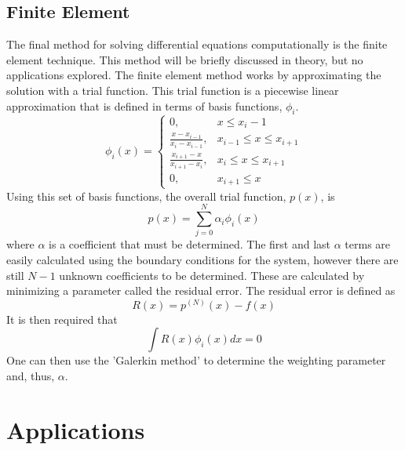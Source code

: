 \documentclass[12pt]{article}
\begin{document}
\subsection{Finite Element}
The final method for solving differential equations computationally is the finite element technique.  This method will be briefly discussed in theory, but no applications explored.  The finite element method works by approximating the solution with a trial function.  This trial function is a piecewise linear approximation that is defined in terms of basis functions, $\phi_i$.
 \begin{displaymath}
   \phi_i(x) = \left\{
     \begin{array}{lr}
       0 ,&  x\leq x_i-1\\
       \frac{x-x_{i-1}}{x_i-x_{i-1}}, &  x_{i-1}\leq x \leq x_{i+1}\\
       \frac{x_{i+1}-x}{x_{i+1}-x_i}, &  x_i\leq x \leq x_{i+1} \\
       0, & x_{i+1} \leq x
     \end{array}
   \right.
\end{displaymath}
Using this set of basis functions, the overall trial function, $p(x)$, is
\begin{equation}
\label{trialFunc}
p(x) = \sum_{j=0}^N \alpha_i \phi_i(x)
\end{equation}
where $\alpha$ is a coefficient that must be determined.  The first and last $\alpha$ terms are easily calculated using the boundary conditions for the system, however there are still $N-1$ unknown coefficients to be determined.  These are calculated by minimizing a parameter called the residual error.  The residual error is defined as
\begin{equation}
\label{residErr}
R(x) = p^{(N)}(x)-f(x)
\end{equation}
It is then required that
\begin{equation}
\label{residInt}
\int R(x) \phi_i(x) dx = 0
\end{equation}
One can then use the 'Galerkin method' to determine the weighting parameter and, thus, $\alpha$.
\section{Applications}
\end{document}
